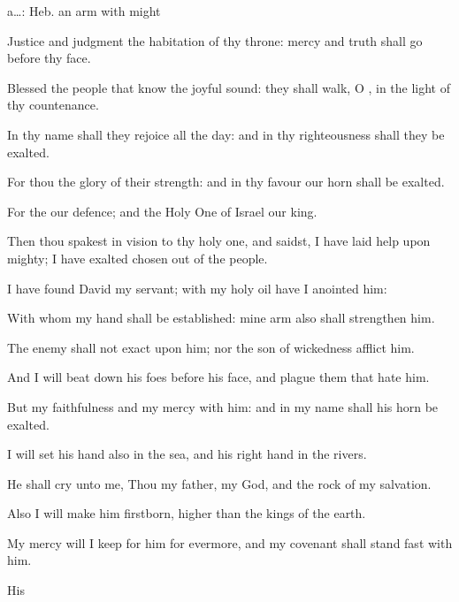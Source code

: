 {{a…: Heb. an arm with might}
\par }{\Q {}Justice and
judgment
{} the
habitation of thy
throne:
mercy and
truth shall
go before thy
face.
\par }{\BB \par }{\Q {}Blessed
{} the
people that
know the joyful
sound: they shall
walk, O
{}, in the
light of thy
countenance.
\par }{\Q {}In thy
name shall they
rejoice all the
day: and in thy
righteousness shall they be
exalted.
\par }{\Q {}For thou
{} the
glory of their
strength: and in thy
favour our
horn shall be
exalted.
\par }{\Q {}For the
{}
{} our
defence; and the Holy
One of
Israel
{} our
king.
\par }{\BB \par }{\Q {}Then thou
spakest in
vision to thy holy
one, and
saidst, I have
laid
help upon
{}
mighty; I have
exalted
{}
chosen out of the
people.
\par }{\Q {}I have
found
David my
servant; with my
holy
oil have I
anointed him:
\par }{\Q {}With whom my
hand shall be
established: mine
arm also shall
strengthen him.
\par }{\Q {}The
enemy shall not
exact upon him; nor the
son of
wickedness
afflict him.
\par }{\Q {}And I will beat
down his
foes before his
face, and
plague them that
hate him.
\par }{\Q {}But my
faithfulness and my
mercy
{} with him: and in my
name shall his
horn be
exalted.
\par }{\Q {}I will
set his
hand also in the
sea, and his right
hand in the
rivers.
\par }{\Q {}He shall
cry unto me, Thou
{} my
father, my
God, and the
rock of my
salvation.
\par }{\Q {}Also I will
make him
{}
firstborn,
higher than the
kings of the
earth.
\par }{\Q {}My
mercy will I
keep for him for
evermore, and my
covenant shall stand
fast with him.
\par }{\Q {}His
}
